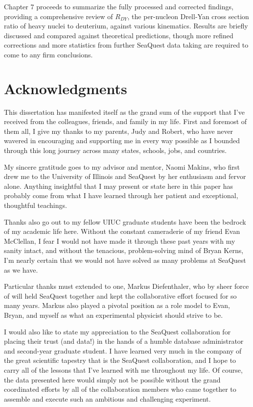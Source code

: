 \documentclass[edeposit,fullpage]{uiucthesis2009}
\begin{document}
Chapter 7 proceeds to summarize the fully processed and corrected findings, providing a comprehensive review of $R_{DY}$, the per-nucleon Drell-Yan cross section ratio of heavy nuclei to deuterium, against various kinematics. Results are briefly discussed and compared against theoretical predictions, though more refined corrections and more statistics from further SeaQuest data taking are required to come to any firm conclusions.








%



\chapter*{Acknowledgments}

This dissertation has manifested itself as the grand sum of the support that I've received from the colleagues, friends, and family in my life. First and foremost of them all, I give my thanks to my parents, Judy and Robert, who have never wavered in encouraging and supporting me in every way possible as I bounded through this long journey across many states, schools, jobs, and countries.

My sincere gratitude goes to my advisor and mentor, Naomi Makins, who first drew me to the University of Illinois and SeaQuest by her enthusiasm and fervor alone. Anything insightful that I may present or state here in this paper has probably come from what I have learned through her patient and exceptional, thoughtful teachings.

Thanks also go out to my fellow UIUC graduate students have been the bedrock of my academic life here. Without the constant cameraderie of my friend Evan McClellan, I fear I would not have made it through these past years with my sanity intact, and without the tenacious, problem-solving mind of Bryan Kerns, I'm nearly certain that we would not have solved as many problems at SeaQuest as we have.

Particular thanks must extended to one, Markus Diefenthaler, who by sheer force of will held SeaQuest together and kept the collaborative effort focused for so many years. Markus also played a pivotal position as a role model to Evan, Bryan, and myself as what an experimental physicist should strive to be.

I would also like to state my appreciation to the SeaQuest collaboration for placing their trust (and data!) in the hands of a humble database administrator and second-year graduate student. I have learned very much in the company of the great scientific tapestry that is the SeaQuest collaboration, and I hope to carry all of the lessons that I've learned with me throughout my life. Of course, the data presented here would simply not be possible without the grand coordinated efforts by all of the collaboration members who came together to assemble and execute such an ambitious and challenging experiment.
\end{document}

